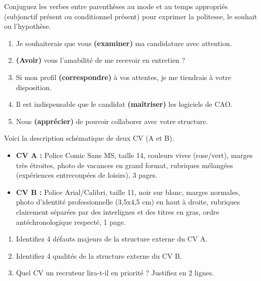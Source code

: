 \documentclass[11pt]{article}
\newcounter{popsec}
\newcounter{popsub}
\newcommand{\courssub}[1]{%
  \stepcounter{popsub}%
  \par\vspace{9pt}\noindent{\popxbold\fontsize{11.5}{13}\selectfont\color{popink}{\color{poporange}\thepopsec.\thepopsub}\hspace{6pt}#1}\par\nopagebreak\vspace{4pt}
}
\begin{document}
\begin{exercice}
Conjuguez les verbes entre parenthèses au mode et au temps appropriés (subjonctif présent ou conditionnel présent) pour exprimer la politesse, le souhait ou l'hypothèse.
\begin{enumerate}
\item Je souhaiterais que vous \textbf{(examiner)} ma candidature avec attention.
\item \textbf{(Avoir)} vous l'amabilité de me recevoir en entretien ?
\item Si mon profil \textbf{(correspondre)} à vos attentes, je me tiendrais à votre disposition.
\item Il est indispensable que le candidat \textbf{(maîtriser)} les logiciels de CAO.
\item Nous \textbf{(apprécier)} de pouvoir collaborer avec votre structure.
\end{enumerate}
\end{exercice}

\courssub{Je m'entraîne}

\begin{exercice}
Voici la description schématique de deux CV (A et B).
\begin{itemize}
\item \textbf{CV A :} Police Comic Sans MS, taille 14, couleurs vives (rose/vert), marges très étroites, photo de vacances en grand format, rubriques mélangées (expériences entrecoupées de loisirs), 3 pages.
\item \textbf{CV B :} Police Arial/Calibri, taille 11, noir sur blanc, marges normales, photo d'identité professionnelle (3,5x4,5 cm) en haut à droite, rubriques clairement séparées par des interlignes et des titres en gras, ordre antéchronologique respecté, 1 page.
\end{itemize}
\begin{enumerate}
\item Identifiez 4 défauts majeurs de la structure externe du CV A.
\item Identifiez 4 qualités de la structure externe du CV B.
\item Quel CV un recruteur lira-t-il en priorité ? Justifiez en 2 lignes.
\end{enumerate}
\end{exercice}
\end{document}
